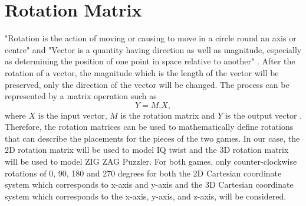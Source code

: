 \section{Rotation Matrix}
"Rotation is the action of moving or causing to move in a circle round an axis or centre" and "Vector is a quantity having direction as well as magnitude, especially as determining the position of one point in space relative to another" \cite{r14}. After the rotation of a vector, the magnitude which is the length of the vector will be preserved, only the direction of the vector will be changed. The process can be represented by a matrix operation such as 
\begin{equation}
Y=M.X,
\end{equation}
where $X$ is the input vector, $M$ is the rotation matrix and $Y$ is the output vector \cite{r15}. Therefore, the rotation matrices can be used to mathematically define rotations that can describe the placements for the pieces of the two games. In our case, the 2D rotation matrix will be used to model IQ twist and the 3D rotation matrix will be used to model ZIG ZAG Puzzler. For both games, only counter-clockwise rotations of 0, 90, 180 and 270 degrees for both the 2D Cartesian coordinate system which corresponds to x-axis and y-axis and the 3D Cartesian coordinate system which corresponds to the x-axis, y-axis, and z-axis, will be considered.
